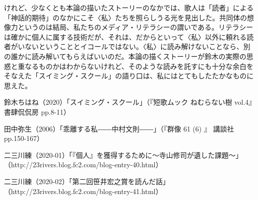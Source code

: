 \documentclass[uplatex,a4paper,oneside,landscape]{jsarticle}
\begin{document}
けれど、少なくとも本論の描いたストーリーのなかでは、歌⼈は「読者」による「神話的期待」のなかにこそ〈私〉たちを照らしうる光を⾒出した。共同体の想像⼒というのは結局、私たちのメディア・リテラシーの謂いである。リテラシーは確かに個⼈に属する技術だが、それは、だからといって〈私〉以外に頼れる読者がいないということとイコールではない。〈私〉に読み解けないことなら、別の誰かに読み解いてもらえばいいのだ。本論の描くストーリーが鈴⽊の実際の思惑と重なるものかはわからないけれど、そのような読みを託すにも⼗分な余⽩をそなえた「スイミング・スクール」の語り⼝は、私にはとてもしたたかなものに思えた。


\begin{thebibliography}{99}
\item 鈴⽊ちはね（2020）「スイミング・スクール」（『短歌ムック ねむらない樹
  vol.4』書肆侃侃房 pp.8-11）
\item ⽥中弥⽣（2006）「乖離する私――中村⽂則――」（『群像 61 (6) 』 講談社
  pp.150-167）
\item ⼆三川練（2020-01）「『個⼈』を獲得するために〜寺⼭修司が遺した課題〜」
  （http://23rivers.blog.fc2.com/blog-entry-40.html）
\item ⼆三川練（2020-02）「第⼆回笹井宏之賞を読んだ話」
  （http://23rivers.blog.fc2.com/blog-entry-41.html）
\end{thebibliography}
\end{document}
